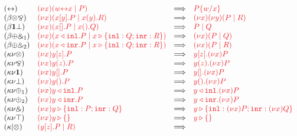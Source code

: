 \documentclass[submission,copyright,creativecommons]{eptcs}
\begin{document}
\begin{figure}[htb]
  \[
    \begin{array}{llcll}
      \hccpRedAxCut1
      & \tm{\cpCut{x}{\cpLink{w}{x}}{P}}
      & \Longrightarrow
      & \tm{\cpSub{w}{x}{P}}
      \\
      \hccpRedBetaTensParr
      & \tm{\cpCut{x}{\piBoundSend{x}{y}{P}}{\piRecv{x}{y}{R}}}
      & \Longrightarrow
      & \tm{\piNew{x}{\piNew{y}{(\piPar{P}{R})}}}
      \\
      \hccpRedBetaOneBot
      & \tm{\cpCut{x}{\piBoundSend{x}{}{P}}{\piRecv{x}{}{Q}}}
      & \Longrightarrow
      & \tm{\piPar{P}{Q}}
      \\
      \hccpRedBetaPlusWith1
      & \tm{\cpCut{x}{\cpInl{x}{P}}{\cpCase{x}{Q}{R}}}
      & \Longrightarrow
      & \tm{\cpCut{x}{P}{Q}}
      \\
      \hccpRedBetaPlusWith2
      & \tm{\cpCut{x}{\cpInr{x}{P}}{\cpCase{x}{Q}{R}}}
      & \Longrightarrow
      & \tm{\cpCut{x}{P}{R}}
      \\
      \hccpRedKappaNuTens
      & \tm{\piNew{x}{\piBoundSend{y}{z}{P}}}
      & \Longrightarrow
      & \tm{\piBoundSend{y}{z}{\piNew{x}{P}}}
      \\
      \hccpRedKappaNuParr
      & \tm{\piNew{x}{\piRecv{y}{z}{P}}}
      & \Longrightarrow
      & \tm{\piRecv{y}{z}{\piNew{x}{P}}}
      \\
      \hccpRedKappaNuOne
      & \tm{\piNew{x}{\piBoundSend{y}{}{P}}}
      & \Longrightarrow
      & \tm{\piBoundSend{y}{}{\piNew{x}{P}}}
      \\
      \hccpRedKappaNuBot
      & \tm{\piNew{x}{\piRecv{y}{}{P}}}
      & \Longrightarrow
      & \tm{\piRecv{y}{}{\piNew{x}{P}}}
      \\
      \hccpRedKappaNuPlus1
      & \tm{\piNew{x}{\cpInl{y}{P}}}
      & \Longrightarrow
      & \tm{\cpInl{y}{\piNew{x}{P}}}
      \\
      \hccpRedKappaNuPlus2
      & \tm{\piNew{x}{\cpInr{y}{P}}}
      & \Longrightarrow
      & \tm{\cpInr{y}{\piNew{x}{P}}}
      \\
      \hccpRedKappaNuWith
      & \tm{\piNew{x}{\cpCase{y}{P}{Q}}}
      & \Longrightarrow
      & \tm{\cpCase{y}{\piNew{x}{P}}{\piNew{x}{Q}}}
      \\
      \hccpRedKappaNuTop
      & \tm{\piNew{x}{\cpAbsurd{y}}}
      & \Longrightarrow
      & \tm{\cpAbsurd{y}}
      \\
      \hccpRedKappaMixTens
      & \tm{(\piPar{\piBoundSend{y}{z}{P}}{R})}
      & \Longrightarrow

\end{array}\]
\end{figure}
\end{document}
